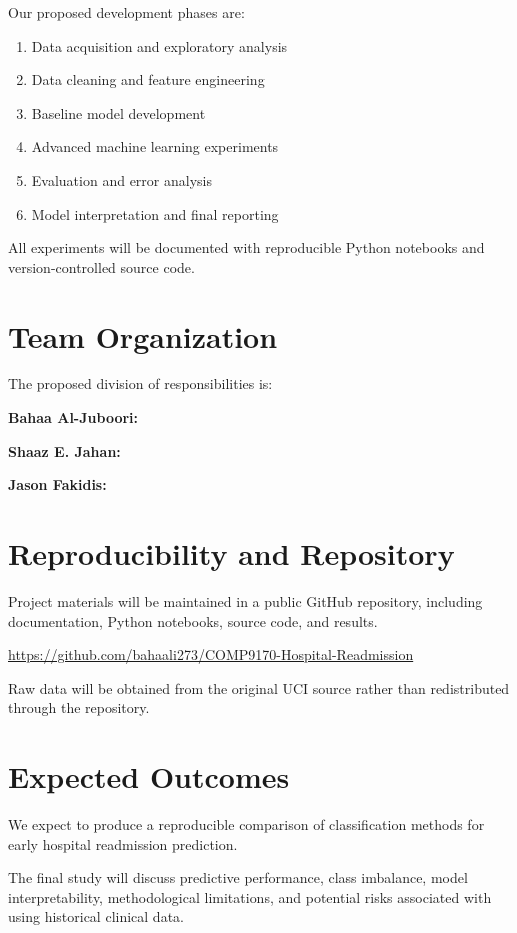\documentclass[conference]{IEEEtran}
\begin{document}
Our proposed development phases are:

\begin{enumerate}
    \item Data acquisition and exploratory analysis
    \item Data cleaning and feature engineering
    \item Baseline model development
    \item Advanced machine learning experiments
    \item Evaluation and error analysis
    \item Model interpretation and final reporting
\end{enumerate}

All experiments will be documented with reproducible
Python notebooks and version-controlled source code.

\section{Team Organization}

The proposed division of responsibilities is:

\textbf{Bahaa Al-Juboori:}


\textbf{Shaaz E. Jahan:}


\textbf{Jason Fakidis:}


\section{Reproducibility and Repository}

Project materials will be maintained in a public
GitHub repository, including documentation,
Python notebooks, source code, and results.

\noindent\url{
https://github.com/bahaali273/COMP9170-Hospital-Readmission
}

Raw data will be obtained from the original
UCI source rather than redistributed through
the repository.

\section{Expected Outcomes}

We expect to produce a reproducible comparison
of classification methods for early hospital
readmission prediction.

The final study will discuss predictive performance,
class imbalance, model interpretability,
methodological limitations, and potential risks
associated with using historical clinical data.
\end{document}
